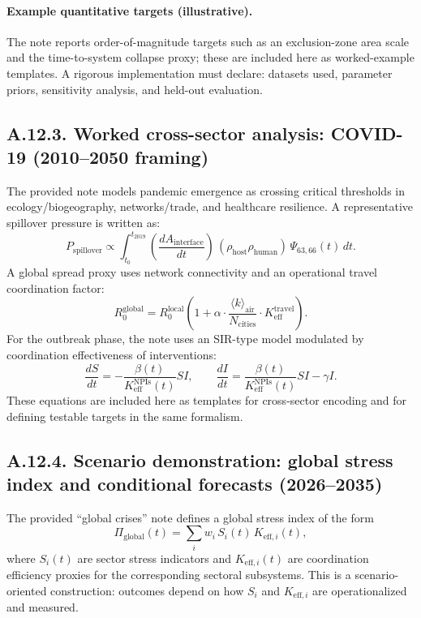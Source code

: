\documentclass[13pt,a4paper]{article}
\begin{document}
	\paragraph{Example quantitative targets (illustrative).}
	The note reports order-of-magnitude targets such as an exclusion-zone area scale and the time-to-system collapse proxy; these are included here as worked-example templates. A rigorous implementation must declare: datasets used, parameter priors, sensitivity analysis, and held-out evaluation.
	
	\subsection*{A.12.3. Worked cross-sector analysis: COVID-19 (2010--2050 framing)}
	
	The provided note models pandemic emergence as crossing critical thresholds in ecology/biogeography, networks/trade, and healthcare resilience. A representative spillover pressure is written as:
	$$
	P_{\mathrm{spillover}} \propto \int_{t_0}^{t_{2019}}
	\left(\frac{dA_{\mathrm{interface}}}{dt}\right)\,
	\left(\rho_{\mathrm{host}}\rho_{\mathrm{human}}\right)\,
	\Psi_{63,66}(t)\,dt.
	$$
	A global spread proxy uses network connectivity and an operational travel coordination factor:
	$$
	R_0^{\mathrm{global}} = R_0^{\mathrm{local}}\left(1+\alpha\cdot \frac{\langle k\rangle_{\mathrm{air}}}{N_{\mathrm{cities}}}\cdot K_{\mathrm{eff}}^{\mathrm{travel}}\right).
	$$
	For the outbreak phase, the note uses an SIR-type model modulated by coordination effectiveness of interventions:
	$$
	\frac{dS}{dt} = - \frac{\beta(t)}{K_{\mathrm{eff}}^{\mathrm{NPIs}}(t)}SI,\qquad
	\frac{dI}{dt} = \frac{\beta(t)}{K_{\mathrm{eff}}^{\mathrm{NPIs}}(t)}SI - \gamma I.
	$$
	These equations are included here as templates for cross-sector encoding and for defining testable targets in the same formalism.
	
	\subsection*{A.12.4. Scenario demonstration: global stress index and conditional forecasts (2026--2035)}
	
	The provided ``global crises'' note defines a global stress index of the form
	$$
	\Pi_{\mathrm{global}}(t) = \sum_i w_i\,S_i(t)\,K_{\mathrm{eff},i}(t),
	$$
	where $S_i(t)$ are sector stress indicators and $K_{\mathrm{eff},i}(t)$ are coordination efficiency proxies for the corresponding sectoral subsystems. This is a scenario-oriented construction: outcomes depend on how $S_i$ and $K_{\mathrm{eff},i}$ are operationalized and measured.
	
\end{document}
